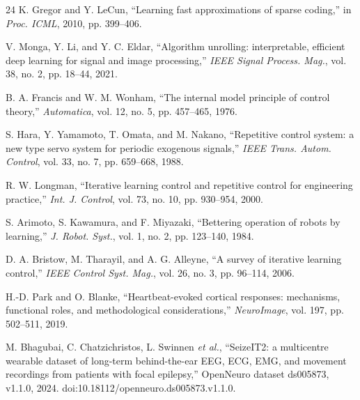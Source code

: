 \documentclass[conference]{IEEEtran}
\begin{document}
\begin{thebibliography}{24}
 K. Gregor and Y. LeCun, ``Learning fast approximations of sparse coding,'' in
\emph{Proc. ICML}, 2010, pp. 399--406.

 V. Monga, Y. Li, and Y. C. Eldar, ``Algorithm unrolling: interpretable,
efficient deep learning for signal and image processing,'' \emph{IEEE Signal Process. Mag.}, vol.
38, no. 2, pp. 18--44, 2021.

 B. A. Francis and W. M. Wonham, ``The internal model principle of control
theory,'' \emph{Automatica}, vol. 12, no. 5, pp. 457--465, 1976.

 S. Hara, Y. Yamamoto, T. Omata, and M. Nakano, ``Repetitive control system: a
new type servo system for periodic exogenous signals,'' \emph{IEEE Trans. Autom. Control}, vol. 33,
no. 7, pp. 659--668, 1988.

 R. W. Longman, ``Iterative learning control and repetitive control for
engineering practice,'' \emph{Int. J. Control}, vol. 73, no. 10, pp. 930--954, 2000.

 S. Arimoto, S. Kawamura, and F. Miyazaki, ``Bettering operation of robots by
learning,'' \emph{J. Robot. Syst.}, vol. 1, no. 2, pp. 123--140, 1984.

 D. A. Bristow, M. Tharayil, and A. G. Alleyne, ``A survey of iterative
learning control,'' \emph{IEEE Control Syst. Mag.}, vol. 26, no. 3, pp. 96--114, 2006.

 H.-D. Park and O. Blanke, ``Heartbeat-evoked cortical responses: mechanisms,
functional roles, and methodological considerations,'' \emph{NeuroImage}, vol. 197, pp. 502--511,
2019.

 M. Bhagubai, C. Chatzichristos, L. Swinnen \emph{et al.}, ``SeizeIT2: a
multicentre wearable dataset of long-term behind-the-ear EEG, ECG, EMG, and movement recordings
from patients with focal epilepsy,'' OpenNeuro dataset ds005873, v1.1.0, 2024.
doi:10.18112/openneuro.ds005873.v1.1.0.

\end{thebibliography}
\end{document}
